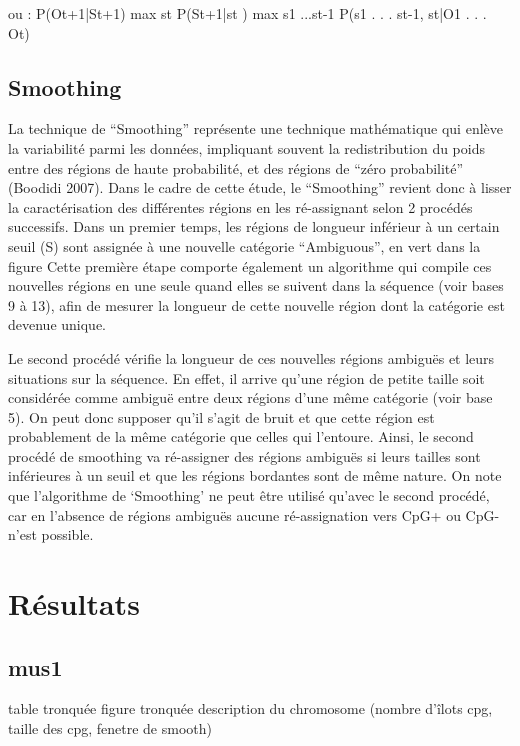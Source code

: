 \documentclass[10pt,a4paper,notitlepage,colorinlistoftodos]{article}
\begin{document}
\begin{multicols}{2}
ou :  P(Ot+1|St+1)  max st P(St+1|st )  max s1 ...st-1 P(s1 . . . st-1, st|O1 . . . Ot)  
 

\subsection{Smoothing}

La technique de “Smoothing” représente une technique mathématique qui enlève la variabilité parmi les données, impliquant souvent la redistribution du poids entre des régions de haute probabilité, et des régions de “zéro probabilité” (Boodidi 2007). 
Dans le cadre de cette étude, le “Smoothing” revient donc à lisser la caractérisation des différentes régions en les ré-assignant selon 2 procédés successifs. 
Dans un premier temps, les régions de longueur inférieur à un certain seuil (S) sont assignée à une nouvelle catégorie “Ambiguous”, en vert dans la figure  %
Cette première étape comporte également un algorithme qui compile ces nouvelles régions en une seule quand elles se suivent dans la séquence (voir bases 9 à 13), afin de mesurer la longueur de cette nouvelle région dont la catégorie est devenue unique.

Le second procédé vérifie la longueur de ces nouvelles régions ambiguës et leurs situations sur la séquence. En effet, il arrive qu’une région de petite taille soit considérée comme ambiguë entre deux régions d’une même catégorie (voir base 5). On peut donc supposer qu’il s’agit de bruit et que cette région est probablement de la même catégorie que celles qui l’entoure. Ainsi, le second procédé de smoothing va ré-assigner des régions ambiguës si leurs tailles sont inférieures à un seuil et que les régions bordantes sont de même nature.
On note que l'algorithme de ‘Smoothing’ ne peut être utilisé qu’avec le second procédé, car en l’absence de régions ambiguës aucune ré-assignation vers CpG+ ou CpG- n’est possible. 

\section*{Résultats}
\subsection*{mus1}
table tronquée
figure tronquée
description du chromosome (nombre d’îlots cpg, taille des cpg, fenetre de smooth)

\end{multicols}
\end{document}
